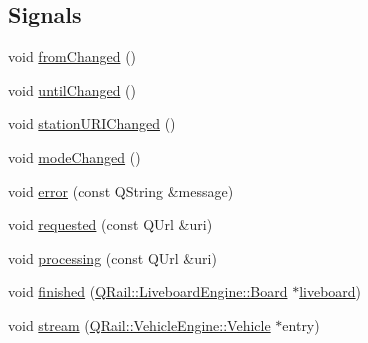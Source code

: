 \subsection*{Signals}
\begin{DoxyCompactItemize}
\item 
void \mbox{\hyperlink{classQRail_1_1LiveboardEngine_1_1Factory_a32f0025c70c2c793d66208f558a7a355}{from\+Changed}} ()
\item 
void \mbox{\hyperlink{classQRail_1_1LiveboardEngine_1_1Factory_a81b9ba54949f8389e63a65c4e91e3d19}{until\+Changed}} ()
\item 
void \mbox{\hyperlink{classQRail_1_1LiveboardEngine_1_1Factory_ac879b9931b3168dceb8e3ad111aa774c}{station\+U\+R\+I\+Changed}} ()
\item 
void \mbox{\hyperlink{classQRail_1_1LiveboardEngine_1_1Factory_a77c3c40bf35560a3893a3f162156f41a}{mode\+Changed}} ()
\item 
void \mbox{\hyperlink{classQRail_1_1LiveboardEngine_1_1Factory_a0c8fab5c22d9a46f00afea2fd9224421}{error}} (const Q\+String \&message)
\item 
void \mbox{\hyperlink{classQRail_1_1LiveboardEngine_1_1Factory_a81b2d8c3bde4886199fba81e09fd8cdd}{requested}} (const Q\+Url \&uri)
\item 
void \mbox{\hyperlink{classQRail_1_1LiveboardEngine_1_1Factory_ab71b4c2d7d4f99fd4b12b0e92c0d8965}{processing}} (const Q\+Url \&uri)
\item 
void \mbox{\hyperlink{classQRail_1_1LiveboardEngine_1_1Factory_a3a429744d6ed2685d62fe554dd2e84cb}{finished}} (\mbox{\hyperlink{classQRail_1_1LiveboardEngine_1_1Board}{Q\+Rail\+::\+Liveboard\+Engine\+::\+Board}} $\ast$\mbox{\hyperlink{classQRail_1_1LiveboardEngine_1_1Factory_a6534f49a21cd36099bd2bdece775e8cc}{liveboard}})
\item 
void \mbox{\hyperlink{classQRail_1_1LiveboardEngine_1_1Factory_a554a8d4a9cdd0e0306763a003036ef93}{stream}} (\mbox{\hyperlink{classQRail_1_1VehicleEngine_1_1Vehicle}{Q\+Rail\+::\+Vehicle\+Engine\+::\+Vehicle}} $\ast$entry)
\end{DoxyCompactItemize}
